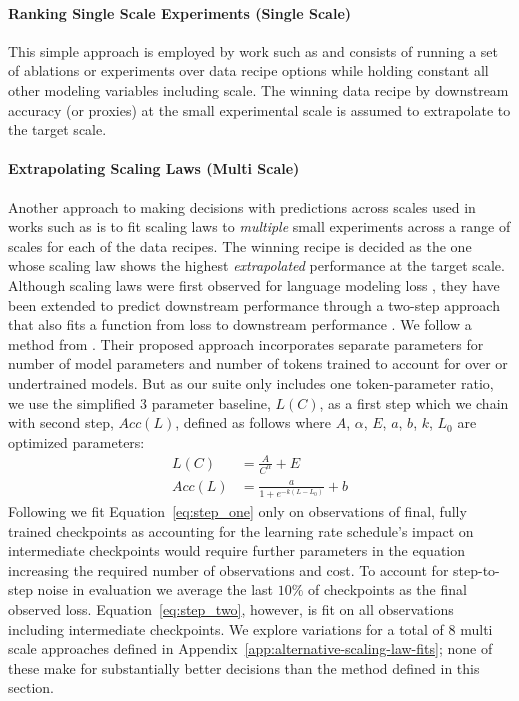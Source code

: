 \documentclass{article}
\theoremstyle{plain}
\theoremstyle{definition}
\theoremstyle{remark}
\newcommand{\suite}{suite}
\newcommand{\numScalingLaws}{8}
\begin{document}
\paragraph{Ranking Single Scale Experiments (Single Scale)} This simple approach is employed by work such as \citet{li2024datacomplmsearchgenerationtraining} and consists of running a set of ablations or experiments over data recipe options while holding constant all other modeling variables including scale. The winning data recipe by downstream accuracy (or proxies) at the small experimental scale is assumed to extrapolate to the target scale. 

\paragraph{Extrapolating Scaling Laws (Multi Scale)} Another approach to making decisions with predictions across scales used in works such as \citet{Dubey2024TheL3} is to fit scaling laws to \textit{multiple} small experiments across a range of scales for each of the data recipes. The winning recipe is decided as the one whose scaling law shows the highest \textit{extrapolated} performance at the target scale. Although scaling laws were first observed for language modeling loss \citep{kaplan2020scalinglawsneurallanguage,hoffmann2022trainingcomputeoptimallargelanguage}, they have been extended to predict downstream performance through a two-step approach that also fits a function from loss to downstream performance \citep{gadre2024languagemodelsscalereliably, bhagia2024establishingtaskscalinglaws}. We follow a method from \citet{bhagia2024establishingtaskscalinglaws}. Their proposed approach incorporates separate parameters for number of model parameters and number of tokens trained to account for over or undertrained models. But as our \suite{} only includes one token-parameter ratio, we use the simplified 3 parameter baseline, $L(C)$, as a first step which we chain with second step, $Acc(L)$, defined as follows where $A$, $\alpha$, $E$, $a$, $b$, $k$, $L_0$ are optimized parameters:
\begin{align}
\label{eq:step_one}
L(C) & = \frac{A}{C^\alpha} + E \\
\label{eq:step_two}
Acc(L) & = \frac{a}{1 + e^{-k(L - L_0)}} + b
\end{align}
Following \citet{bhagia2024establishingtaskscalinglaws} we fit Equation~\ref{eq:step_one} only on observations of final, fully trained checkpoints as accounting for the learning rate schedule's impact on intermediate checkpoints would require further parameters in the equation increasing the required number of observations and cost. To account for step-to-step noise in evaluation we average the last $10\%$ of checkpoints as the final observed loss. Equation~\ref{eq:step_two}, however, is fit on all observations including intermediate checkpoints. 
We explore variations for a total of \numScalingLaws{} multi scale approaches defined in Appendix~\ref{app:alternative-scaling-law-fits}; none of these make for substantially better decisions than the method defined in this section.
\end{document}
